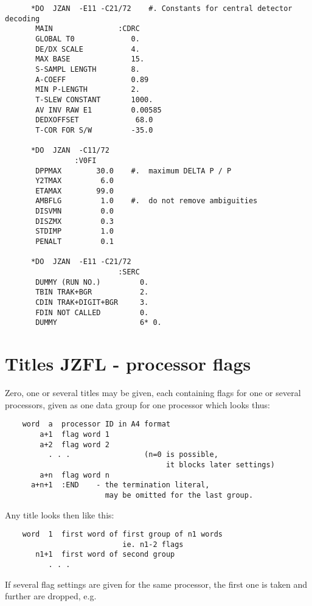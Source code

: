 \begin{verbatim}
      *DO  JZAN  -E11 -C21/72    #. Constants for central detector decoding
       MAIN               :CDRC
       GLOBAL T0             0.
       DE/DX SCALE           4.
       MAX BASE              15.
       S-SAMPL LENGTH        8.
       A-COEFF               0.89
       MIN P-LENGTH          2.
       T-SLEW CONSTANT       1000.
       AV INV RAW E1         0.00585
       DEDXOFFSET             68.0
       T-COR FOR S/W         -35.0

      *DO  JZAN  -C11/72
                :V0FI
       DPPMAX        30.0    #.  maximum DELTA P / P
       Y2TMAX         6.0
       ETAMAX        99.0
       AMBFLG         1.0    #.  do not remove ambiguities
       DISVMN         0.0
       DISZMX         0.3
       STDIMP         1.0
       PENALT         0.1

      *DO  JZAN  -E11 -C21/72
                          :SERC
       DUMMY (RUN NO.)         0.
       TBIN TRAK+BGR           2.
       CDIN TRAK+DIGIT+BGR     3.
       FDIN NOT CALLED         0.
       DUMMY                   6* 0.
\end{verbatim} 

\newpage
{}
\section{Titles JZFL - processor flags}

Zero, one or several titles may be given,
each containing flags for one or several processors,
given as one data group for one processor which looks thus:

\begin{verbatim}
    word  a  processor ID in A4 format
        a+1  flag word 1
        a+2  flag word 2
          . . .                 (n=0 is possible,
                                     it blocks later settings)
        a+n  flag word n
      a+n+1  :END    - the termination literal,
                       may be omitted for the last group.
\end{verbatim}

Any  title looks then like this:

\begin{verbatim}
    word  1  first word of first group of n1 words
                           ie. n1-2 flags
       n1+1  first word of second group
          . . .
\end{verbatim} 

If several flag settings are given for the same processor,
the first one is taken and further are dropped, e.g.

